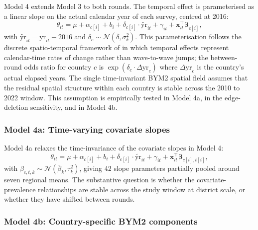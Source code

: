 \documentclass{article}
\begin{document}
Model 4 extends Model 3 to both rounds. The temporal effect is
parameterised as a linear slope on the actual calendar year of each
survey, centred at 2016: \begin{equation}
\theta_{it} = \mu + \alpha_{c[i]} + b_i + \delta_{c[i]} \cdot \widetilde{\text{yr}}_{it}
                 + \gamma_{it} + \mathbf{x}_{it}^{\top}\bm{\beta}_{c[i]},
\label{eq:m4}
\end{equation} with
\(\widetilde{\text{yr}}_{it} = \text{yr}_{it} - 2016\) and
\(\delta_c \sim \mathcal{N}(\bar\delta, \sigma_\delta^2)\). This
parameterisation follows the discrete spatio-temporal framework of
\citep{wakefield2020} in which temporal effects represent calendar-time
rates of change rather than wave-to-wave jumps; the between-round odds
ratio for country \(c\) is \(\exp(\delta_c \cdot \Delta\text{yr}_c)\)
where \(\Delta\text{yr}_c\) is the country's actual elapsed years. The
single time-invariant BYM2 spatial field assumes that the residual
spatial structure within each country is stable across the 2010 to 2022
window. This assumption is empirically tested in Model 4a, in the
edge-deletion sensitivity, and in Model 4b.

\subsubsection{Model 4a: Time-varying covariate
slopes}\label{model-4a-time-varying-covariate-slopes}

Model 4a relaxes the time-invariance of the covariate slopes in Model 4:
\begin{equation}
\theta_{it} = \mu + \alpha_{c[i]} + b_i + \delta_{c[i]} \cdot \widetilde{\text{yr}}_{it}
                 + \gamma_{it} + \mathbf{x}_{it}^{\top}\bm{\beta}_{c[i], t[i]},
\end{equation} with
\(\beta_{c, t, k} \sim \mathcal{N}(\bar\beta_k, \tau_k^2)\), giving 42
slope parameters partially pooled around seven regional means. The
substantive question is whether the covariate-prevalence relationships
are stable across the study window at district scale, or whether they
have shifted between rounds.

\subsubsection{Model 4b: Country-specific BYM2
components}\label{model-4b-country-specific-bym2-components}
\end{document}

